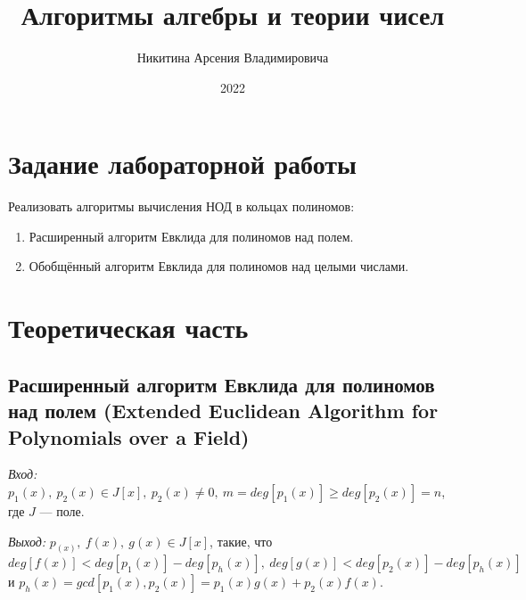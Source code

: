 \documentclass[bachelor, och, labwork]{shiza}
\begin{document}
\title{Алгоритмы алгебры и теории чисел}





\author{Никитина Арсения Владимировича}




\date{2022}

\maketitle



\tableofcontents

\section{Задание лабораторной работы}

Реализовать алгоритмы вычисления НОД в кольцах полиномов:

\begin{enumerate}
    \item Расширенный алгоритм Евклида для полиномов над полем.
    \item Обобщённый алгоритм Евклида для полиномов над целыми числами.
\end{enumerate}

\section{Теоретическая часть}

\subsection{Расширенный алгоритм Евклида для полиномов над
полем (Extended Euclidean Algorithm for Polynomials over a Field)}


\textit{Вход:} $p_1(x), ~p_2(x) \in J[x], ~p_2(x) \not= 0, ~m = deg[p_1(x)] \geqslant deg[p_2(x)] = n$,
где $J$ --- поле.

\textit{Выход:} $p_(x), ~f(x), ~g(x) \in J[x]$, такие, что 
$deg[f(x)] < deg[p_1(x)] - deg[p_h(x)], ~deg[g(x)] < deg[p_2(x)] - deg[p_h(x)]$
и $p_h(x) = gcd[p_1(x), p_2(x)] = p_1(x)g(x) + p_2(x)f(x)$.
\end{document}

